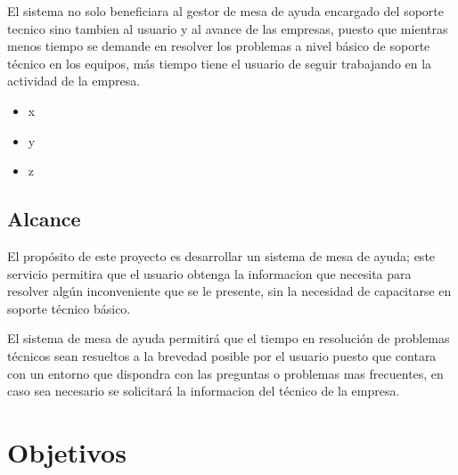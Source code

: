 \documentclass[preprint,12pt]{elsarticle}
\begin{document}
El sistema no solo beneficiara al gestor de mesa de ayuda encargado del soporte tecnico sino tambien al usuario y al avance de las empresas, puesto que mientras menos tiempo se demande en resolver los problemas a nivel básico de soporte técnico en los equipos, más tiempo tiene el usuario de seguir trabajando en la actividad de la empresa.

\cite{Gartner} 

\begin{itemize}
	\item x
	\item y
	\item z
\end{itemize}


\subsection {\textbf{Alcance}}
El propósito de este proyecto es desarrollar un sistema de mesa de ayuda; este servicio permitira que el usuario obtenga la informacion que necesita para resolver algún inconveniente que se le presente, sin la necesidad de capacitarse en soporte técnico básico.

El sistema de mesa de ayuda permitirá que el tiempo en resolución de problemas técnicos sean resueltos a la brevedad posible por el usuario puesto que contara con un entorno que dispondra con las preguntas o problemas mas frecuentes, en caso sea necesario se solicitará la informacion del técnico de la empresa.



\section{Objetivos}
\begin{figure}[htb]
	\begin{center}
	\end{center}
\end{figure}
\end{document}

